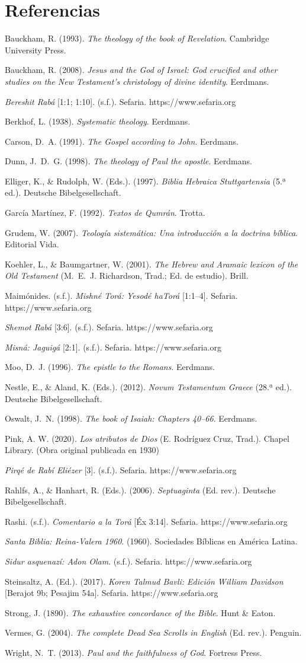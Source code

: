 \documentclass[11pt,letterpaper]{article}
\newcommand{\refapa}[1]{\par{\RaggedRight\hangindent=1.27cm\hangafter=1\noindent #1\par}\vspace{4pt}}
\begin{document}
\section*{Referencias}
\refapa{Bauckham, R. (1993). \emph{The theology of the book of Revelation}. Cambridge University Press.}
\refapa{Bauckham, R. (2008). \emph{Jesus and the God of Israel: God crucified and other studies on the New Testament's christology of divine identity}. Eerdmans.}
\refapa{\emph{Bereshit Rabá} [1:1; 1:10]. (s.f.). Sefaria. https://www.sefaria.org}
\refapa{Berkhof, L. (1938). \emph{Systematic theology}. Eerdmans.}
\refapa{Carson, D.~A. (1991). \emph{The Gospel according to John}. Eerdmans.}
\refapa{Dunn, J.~D.~G. (1998). \emph{The theology of Paul the apostle}. Eerdmans.}
\refapa{Elliger, K., \& Rudolph, W. (Eds.). (1997). \emph{Biblia Hebraica Stuttgartensia} (5.ª ed.). Deutsche Bibelgesellschaft.}
\refapa{García Martínez, F. (1992). \emph{Textos de Qumrán}. Trotta.}
\refapa{Grudem, W. (2007). \emph{Teología sistemática: Una introducción a la doctrina bíblica}. Editorial Vida.}
\refapa{Koehler, L., \& Baumgartner, W. (2001). \emph{The Hebrew and Aramaic lexicon of the Old Testament} (M.~E.~J. Richardson, Trad.; Ed. de estudio). Brill.}
\refapa{Maimónides. (s.f.). \emph{Mishné Torá: Yesodé haTorá} [1:1--4]. Sefaria. https://www.sefaria.org}
\refapa{\emph{Shemot Rabá} [3:6]. (s.f.). Sefaria. https://www.sefaria.org}
\refapa{\emph{Misná: Jaguigá} [2:1]. (s.f.). Sefaria. https://www.sefaria.org}
\refapa{Moo, D.~J. (1996). \emph{The epistle to the Romans}. Eerdmans.}
\refapa{Nestle, E., \& Aland, K. (Eds.). (2012). \emph{Novum Testamentum Graece} (28.ª ed.). Deutsche Bibelgesellschaft.}
\refapa{Oswalt, J.~N. (1998). \emph{The book of Isaiah: Chapters 40--66}. Eerdmans.}
\refapa{Pink, A. W. (2020). \emph{Los atributos de Dios} (E. Rodríguez Cruz, Trad.). Chapel Library. (Obra original publicada en 1930)}
\refapa{\emph{Pirqé de Rabí Eliézer} [3]. (s.f.). Sefaria. https://www.sefaria.org}
\refapa{Rahlfs, A., \& Hanhart, R. (Eds.). (2006). \emph{Septuaginta} (Ed. rev.). Deutsche Bibelgesellschaft.}
\refapa{Rashi. (s.f.). \emph{Comentario a la Torá} [Éx 3:14]. Sefaria. https://www.sefaria.org}
\refapa{\emph{Santa Biblia: Reina-Valera 1960}. (1960). Sociedades Bíblicas en América Latina.}
\refapa{\emph{Sidur asquenazí: Adon Olam}. (s.f.). Sefaria. https://www.sefaria.org}
\refapa{Steinsaltz, A. (Ed.). (2017). \emph{Koren Talmud Bavli: Edición William Davidson} [Berajot 9b; Pesajim 54a]. Sefaria. https://www.sefaria.org}
\refapa{Strong, J. (1890). \emph{The exhaustive concordance of the Bible}. Hunt \& Eaton.}
\refapa{Vermes, G. (2004). \emph{The complete Dead Sea Scrolls in English} (Ed. rev.). Penguin.}
\refapa{Wright, N.~T. (2013). \emph{Paul and the faithfulness of God}. Fortress Press.}
\end{document}
